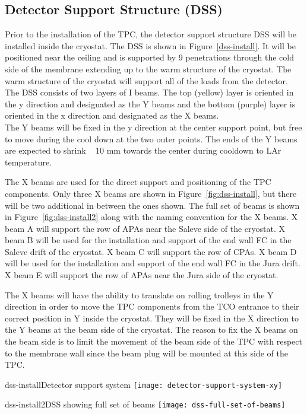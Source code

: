 \subsection{Detector Support Structure (DSS)}


Prior to the installation of the TPC, the detector support structure DSS will be installed inside the cryostat.  The DSS is shown in Figure~\ref{dss-install}.  It will be positioned near the ceiling and is supported by 9 penetrations through the cold side of the membrane extending up to the warm structure of the cryostat.  The warm structure of the cryostat will support all of the loads from the detector.  The DSS consists of two layers of I beams.  The top (yellow) layer is oriented in the y direction and designated as the Y beams and the bottom (purple) layer is oriented in the x direction and designated as the X beams. \\
The Y beams will be fixed in the y direction at the center support point, but free to move during the cool down at the two outer points.  The ends of the Y beams are expected to shrink ~ 10 mm towards the center during cooldown to LAr temperature.  

The X beams are used for the direct support and positioning of the TPC components.  Only three X beams are shown in Figure~\ref{fig:dss-install}, but there will be two additional in between the ones shown.  
The full set of beams is shown in Figure~\ref{fig:dss-install2} along with the naming convention for the X beams.
 X beam A will support the row of APAs near the Saleve side of the cryostat.  X beam B will be used for the installation and support of the end wall FC in the Saleve drift of the cryostat.  X beam C will support the row of CPAs.  X beam D will be used for the installation and support of the end wall FC in the Jura drift.  X beam E will support the row of APAs near the Jura side of the cryostat.  

The X beams will have the ability to translate on rolling trolleys in the Y direction in order to move the TPC components from the TCO entrance to their correct position in Y inside the cryostat.  They will be fixed in the X direction to the Y beams at the beam side of the cryostat.  The reason 
to fix the X beams on the beam side is to limit the movement of the beam side of the TPC with respect to the membrane wall since
the beam plug will be mounted at this side of the TPC.  

\begin{cdrfigure}{dss-install}{Detector support system}
\texttt{[image: detector-support-system-xy]}
\end{cdrfigure}

\begin{cdrfigure}{dss-install2}{DSS showing full set of beams}
 \texttt{[image: dss-full-set-of-beams]}
\end{cdrfigure}
